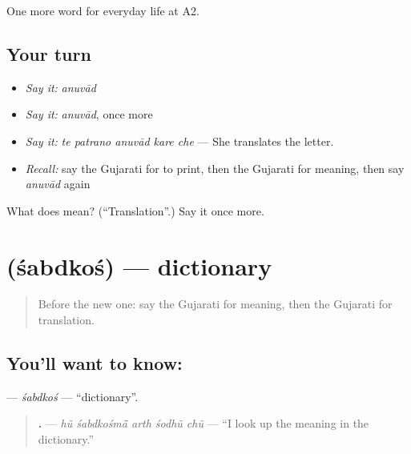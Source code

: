 \begin{grammarlens}[title={What you've built}]
One more word for everyday life at A2.
\end{grammarlens}

\subsection*{Your turn}
\begin{itemize}
\raggedright
  \item \emph{Say it:} \emph{anuvād}
  \item \emph{Say it:} \emph{anuvād}, once more
  \item \emph{Say it:} \emph{te patrano anuvād kare che} — She translates the letter.
  \item \emph{Recall:} say the Gujarati for to print, then the Gujarati for meaning, then say \emph{anuvād} again
\end{itemize}

\begin{tcolorbox}[breakable,colback=teal!4,colframe=teal!35!black,title={Before you move on}]
What does  mean? (\textquotedblleft{}Translation\textquotedblright{}.) Say it once more.
\end{tcolorbox}
\section[\texorpdfstring{\gu{શબ્દકોશ} (śabdkoś)}{શબ્દકોશ (śabdkoś)}]{ (śabdkoś) — dictionary}

\label{lesson:GU-C251-shabdkosh}



\begin{quote}
Before the new one: say the Gujarati for meaning, then the Gujarati for translation.
\end{quote}

\subsection*{You'll want to know: }
\textbf{} — \emph{śabdkoś} — \textquotedblleft{}dictionary\textquotedblright{}.

\begin{quote}
\textbf{    .} — \emph{hũ śabdkośmā̃ arth śodhũ chũ} — \textquotedblleft{}I look up the meaning in the dictionary.\textquotedblright{}
\end{quote}

